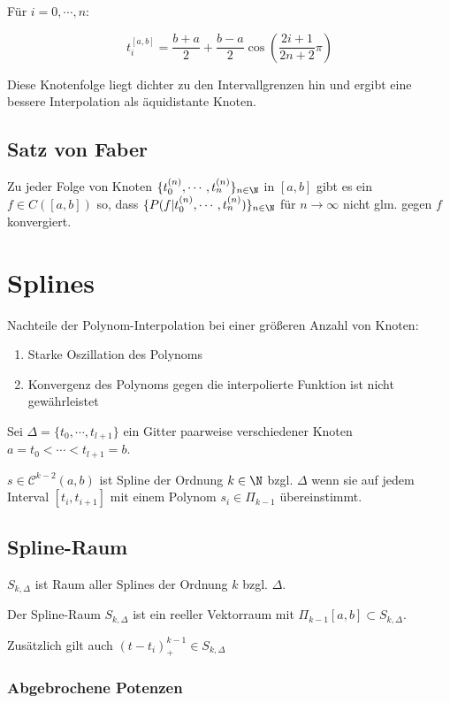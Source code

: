 Für $i = 0,\cdots,n$:

\vspace{-2mm}
$$t_i^{[a,b]} = \frac{b+a}{2} + \frac{b-a}{2} \cos\left(\frac{2i+1}{2n+2} \pi\right)$$

Diese Knotenfolge liegt dichter zu den Intervallgrenzen hin und ergibt eine bessere Interpolation als äquidistante Knoten.

\subsection*{Satz von Faber}

Zu jeder Folge von Knoten $\{t_0^{(n)},\cdots,t_n^{(n)}\}_{n \in \N}$ in $[a,b]$ gibt es ein $f \in C([a,b])$ so, dass $\{P(f|t_0^{(n)},\cdots,t_n^{(n)})\}_{n \in \N}$ für $n \to \infty$ nicht glm. gegen $f$ konvergiert.

\section*{Splines}

Nachteile der Polynom-Interpolation bei einer größeren Anzahl von Knoten:

\begin{enumerate}
	\item Starke Oszillation des Polynoms
	\item Konvergenz des Polynoms gegen die interpolierte Funktion ist nicht gewährleistet
\end{enumerate}

Sei $\Delta = \{t_0,\cdots,t_{l+1}\}$ ein Gitter paarweise verschiedener Knoten $a=t_0 < \cdots < t_{l+1} = b$.

$s \in \mathcal{C}^{k-2}(a,b)$ ist Spline der Ordnung $k \in \N$ bzgl. $\Delta$ wenn sie auf jedem Interval $[t_i,t_{i+1}]$ mit einem Polynom $s_i \in \Pi_{k-1}$ übereinstimmt.

\subsection*{Spline-Raum}

$S_{k,\Delta}$ ist Raum aller Splines der Ordnung $k$ bzgl. $\Delta$.

Der Spline-Raum $S_{k,\Delta}$ ist ein reeller Vektorraum mit $\Pi_{k-1}[a,b] \subset S_{k,\Delta}$.

Zusätzlich gilt auch $(t-t_i)_+^{k-1} \in S_{k,\Delta}$

\subsubsection*{Abgebrochene Potenzen}

